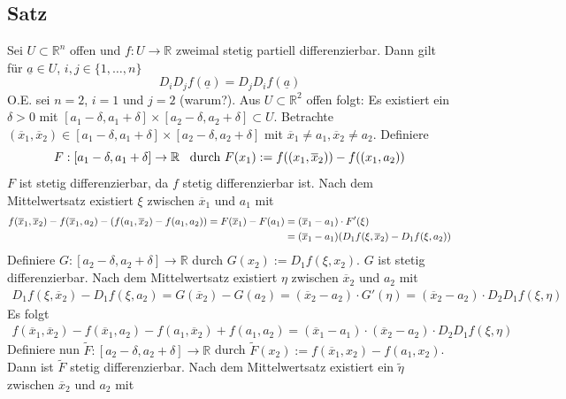 \subsection[Satz über Reihenfolge des Differenzierens]{Satz} %
\label{sub:66}
Sei $U \subset \mathds{R}^n$ offen und $f : U \to \mathds{R}$ zweimal stetig partiell differenzierbar. Dann gilt für $\underline{a} \in U $, $i,j \in \{1, \ldots ,n\}$
\[
	D_i D_j f (\underline{a}) =  D_j D_i f(\underline{a})
\]
O.E. sei $n=2$, $i=1$ und $j=2$ (warum?). Aus $U \subset \mathds{R}^2$ offen folgt: Es existiert ein $\delta >0$ mit 
$[a_1 - \delta , a_1 + \delta ] \times [a_2 - \delta , a_2 + \delta ] \subset U$. Betrachte $(\overline{x}_1, \overline{x}_2) \in  [a_1 - \delta , a_1 + \delta ] \times 
[a_2 - \delta , a_2 + \delta ] $ mit $\overline{x}_1 \not=a_1 , \overline{x}_2 \not= a_2$. Definiere
\[
	F: [a_1 - \delta , a_1 + \delta ] \to \mathds{R} \enspace \text{ durch } F(x_1) := f \enbrace*{ (x_1, \overline{x}_2 )} - f \enbrace*{(x_1, a_2)}  
\]
$F$ ist stetig differenzierbar, da $f$ stetig differenzierbar ist. Nach dem Mittelwertsatz existiert $\xi$ zwischen $\overline{x}_1 $ und $a_1$ mit
\begin{align*}
	f(\overline{x}_1, \overline{x}_2 ) - f(\overline{x}_1, a_2 ) - \enbrace*{ f(a_1, \overline{x}_2 ) - f (a_1, a_2)} = F(\overline{x}_1 ) - F(a_1) &= 
	(\overline{x}_1 - a_1 ) \cdot F'(\xi) \\
	&= (\overline{x}_1 - a_1 ) ( D_1 f(\xi, \overline{x}_2 ) - D_1 f(\xi, a_2) )
\end{align*} 
Definiere $G : [a_2 - \delta , a_2 + \delta ] \to \mathds{R}$ durch $G(x_2) := D_1 f (\xi, x_2)$. $G$ ist stetig differenzierbar. Nach dem Mittelwertsatz existiert
$\eta$ zwischen $\overline{x}_2 $ und $a_2$ mit 
\begin{gather*}
	D_1 f(\xi, \overline{x}_2 ) - D_1 f(\xi, a_2) = G(\overline{x}_2 ) - G(a_2) = (\overline{x}_2 - a_2 ) \cdot G'(\eta) = (\overline{x}_2 - a_2) \cdot D_2 D_1 f(\xi, \eta)
\end{gather*}
Es folgt 
\begin{align*}
	f(\overline{x}_1, \overline{x}_2 ) - f(\overline{x}_1, a_2 ) - f(a_1, \overline{x}_2 ) + f(a_1, a_2) = (\overline{x}_1 - a_1 ) \cdot ( \overline{x}_2 - a_2 ) \cdot  
	D_2 D_1 f(\xi, \eta) \tag{$\star$}
\end{align*}
Definiere nun $\tilde F : [a_2 - \delta , a_2 + \delta ] \to \mathds{R}$ durch $\tilde F (x_2) := f (\overline{x}_1, x_2 ) - f(a_1, x_2)$. Dann ist $\tilde F$ stetig 
differenzierbar. Nach dem Mittelwertsatz existiert ein $\tilde \eta$ zwischen $\overline{x}_2 $ und $a_2$ mit 
